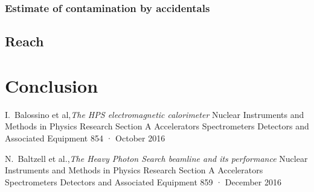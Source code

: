 \documentclass[12pt]{report}
\begin{document}
\subsection{Estimate of contamination by accidentals}

\section{Reach}




\chapter{Conclusion} %


\begin{thebibliography}{99}

  
                                              
                                              
 I.~Balossino et al,{\it The HPS electromagnetic calorimeter} Nuclear Instruments and Methods in Physics Research Section A Accelerators Spectrometers Detectors and Associated Equipment 854 · October 2016    

N.~Baltzell et al.,{\it The Heavy Photon Search beamline and its performance} Nuclear Instruments and Methods in Physics Research Section A Accelerators Spectrometers Detectors and Associated Equipment 859 · December 2016                                          


\end{thebibliography}
\end{document}
